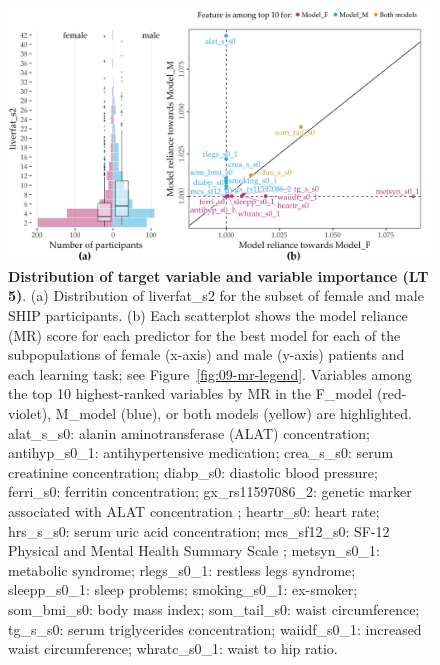 \documentclass[
  oneside]{book}
\begin{document}
\begin{figure}[htb]

{\centering \includegraphics[width=1\linewidth]{figures/09-ship} 

}

\caption{\textbf{Distribution of target variable and variable importance (LT 5)}. (a) Distribution of liverfat\_s2 for the subset of female and male SHIP participants. (b) Each scatterplot shows the model reliance (MR) score for each predictor for the best model for each of the subpopulations of female (x-axis) and male (y-axis) patients and each learning task; see Figure~\ref{fig:09-mr-legend}. Variables among the top 10 highest-ranked variables by MR in the F\_model (red-violet), M\_model (blue), or both models (yellow) are highlighted. alat\_s\_s0: alanin aminotransferase (ALAT) concentration; antihyp\_s0\_1: antihypertensive medication; crea\_s\_s0: serum creatinine concentration; diabp\_s0: diastolic blood pressure; ferri\_s0: ferritin concentration; gx\_rs11597086\_2: genetic marker associated with ALAT concentration \autocite{yuan2008population}; heartr\_s0: heart rate; hrs\_s\_s0: serum uric acid concentration; mcs\_sf12\_s0: SF-12 Physical and Mental Health Summary Scale \autocite{bullinger1995german}; metsyn\_s0\_1: metabolic syndrome; rlegs\_s0\_1: restless legs syndrome; sleepp\_s0\_1: sleep problems; smoking\_s0\_1: ex-smoker; som\_bmi\_s0: body mass index; som\_tail\_s0: waist circumference; tg\_s\_s0: serum triglycerides concentration; waiidf\_s0\_1: increased waist circumference; whratc\_s0\_1: waist to hip ratio.}\label{fig:09-ship}
\end{figure}
\end{document}
